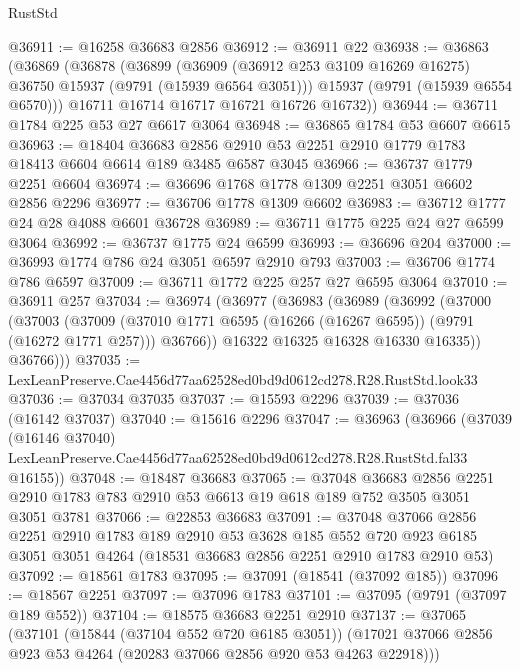 \begin{lexlean}{RustStd}
\begin{coremodule}
@36911 := @16258 @36683 @2856
@36912 := @36911 @22
@36938 := @36863
    (@36869
      (@36878
        (@36899
          (@36909 (@36912 @253 @3109 @16269 @16275) @36750 @15937 (@9791 (@15939 @6564 @3051)))
          @15937
          (@9791 (@15939 @6554 @6570)))
        @16711
        @16714
        @16717
        @16721
        @16726
        @16732))
@36944 := @36711 @1784 @225 @53 @27 @6617 @3064
@36948 := @36865 @1784 @53 @6607 @6615
@36963 := @18404
    @36683
    @2856
    @2910
    @53
    @2251
    @2910
    @1779
    @1783
    @18413
    @6604
    @6614
    @189
    @3485
    @6587
    @3045
@36966 := @36737 @1779 @2251 @6604
@36974 := @36696 @1768 @1778 @1309 @2251 @3051 @6602 @2856 @2296
@36977 := @36706 @1778 @1309 @6602
@36983 := @36712 @1777 @24 @28 @4088 @6601 @36728
@36989 := @36711 @1775 @225 @24 @27 @6599 @3064
@36992 := @36737 @1775 @24 @6599
@36993 := @36696 @204
@37000 := @36993 @1774 @786 @24 @3051 @6597 @2910 @793
@37003 := @36706 @1774 @786 @6597
@37009 := @36711 @1772 @225 @257 @27 @6595 @3064
@37010 := @36911 @257
@37034 := @36974
    (@36977
      (@36983
        (@36989
          (@36992
            (@37000
              (@37003
                (@37009
                  (@37010 @1771 @6595 (@16266 (@16267 @6595)) (@9791 (@16272 @1771 @257)))
                  @36766))
              @16322
              @16325
              @16328
              @16330
              @16335))
          @36766)))
@37035 := LexLeanPreserve.Cae4456d77aa62528ed0bd9d0612cd278.R28.RustStd.look33
@37036 := @37034 @37035
@37037 := @15593 @2296
@37039 := @37036 (@16142 @37037)
@37040 := @15616 @2296
@37047 := @36963
    (@36966
      (@37039
        (@16146 @37040)
        LexLeanPreserve.Cae4456d77aa62528ed0bd9d0612cd278.R28.RustStd.fal33
        @16155))
@37048 := @18487 @36683
@37065 := @37048
    @36683
    @2856
    @2251
    @2910
    @1783
    @783
    @2910
    @53
    @6613
    @19
    @618
    @189
    @752
    @3505
    @3051
    @3051
    @3781
@37066 := @22853 @36683
@37091 := @37048
    @37066
    @2856
    @2251
    @2910
    @1783
    @189
    @2910
    @53
    @3628
    @185
    @552
    @720
    @923
    @6185
    @3051
    @3051
    @4264
    (@18531 @36683 @2856 @2251 @2910 @1783 @2910 @53)
@37092 := @18561 @1783
@37095 := @37091 (@18541 (@37092 @185))
@37096 := @18567 @2251
@37097 := @37096 @1783
@37101 := @37095 (@9791 (@37097 @189 @552))
@37104 := @18575 @36683 @2251 @2910
@37137 := @37065
    (@37101
      (@15844 (@37104 @552 @720 @6185 @3051))
      (@17021 @37066 @2856 @923 @53 @4264 (@20283 @37066 @2856 @920 @53 @4263 @22918)))

\end{coremodule}
\end{lexlean}
